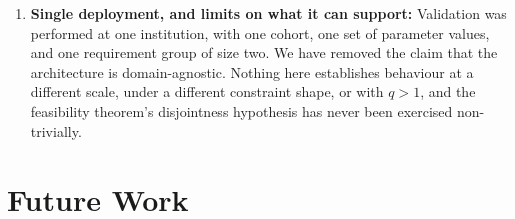 \documentclass[11pt,a4paper]{article}
\theoremstyle{plain}
\theoremstyle{definition}
\theoremstyle{remark}
\begin{document}
\begin{enumerate}[noitemsep,topsep=4pt]
    \item \textbf{Single deployment, and limits on what it can support:} Validation was performed at one institution, with one cohort, one set of parameter values, and one requirement group of size two. We have removed the claim that the architecture is domain-agnostic. Nothing here establishes behaviour at a different scale, under a different constraint shape, or with $q > 1$, and the feasibility theorem's disjointness hypothesis has never been exercised non-trivially.
\end{enumerate}

\section{Future Work}
\label{sec:future}
\end{document}
